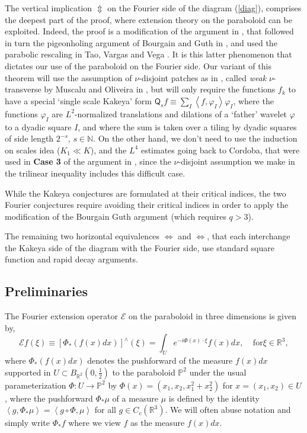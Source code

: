 \documentclass{amsart}%
\theoremstyle{plain}
\numberwithin{equation}{section}
\begin{document}
The vertical implication $\Updownarrow$ on the Fourier side of the diagram
(\ref{diag}), comprises the deepest part of the proof, where extension theory
on the paraboloid can be exploited. Indeed, the proof is a modification of the
argument in \cite[proof of Theorem 3]{RiSa}, that followed in turn the
pigeonholing argument of Bourgain and Guth in \cite[Section 2]{BoGu}, and used
the parabolic rescaling in Tao, Vargas and Vega \cite{TaVaVe}. It is this
latter phenomenon that dictates our use of the paraboloid on the Fourier side.
Our variant of this theorem will use the assumption of $\nu$-disjoint patches
as in \cite{RiSa}, called \emph{weak} $\nu$-transverse by Muscalu and Oliveira
in \cite{MuOl}, but will only require the functions $f_{k}$ to have a special
`single scale Kakeya' form $\mathsf{Q}_{s}f\equiv\sum_{I}\left\langle
f,\varphi_{I}\right\rangle \varphi_{I}$, where the functions $\varphi_{I}$ are
$L^{2}$-normalized translations and dilations of a `father' wavelet $\varphi$
to a dyadic square $I$, and where the sum is taken over a tiling by dyadic
squares of side length $2^{-s}$, $s\in\mathbb{N}$. On the other hand, we don't
need to use the induction on scales idea ($K_{1}\ll K$), and the $L^{4}$
estimates going back to Cordoba, that were used in \textbf{Case 3} of the
argument in \cite[Section 2]{BoGu}, since the $\nu$-disjoint assumption we
make in the trilinear inequality includes this difficult case.

While the Kakeya conjectures are formulated at their critical indices, the two
Fourier conjectures require avoiding their critical indices in order to apply
the modification of the Bourgain Guth argument (which requires $q>3$).

The remaining two horizontal equivalences $\Longleftrightarrow$ and
$\Longleftrightarrow$, that each interchange the Kakeya side of the diagram
with the Fourier side, use standard square function and rapid decay arguments.

\subsection{Preliminaries}

The Fourier extension operator $\mathcal{E}$ on the paraboloid in three
dimensions is given by,%
\[
\mathcal{E}f\left(  \xi\right)  \equiv\left[  \Phi_{\ast}\left(  f\left(
x\right)  dx\right)  \right]  ^{\wedge}\left(  \xi\right)  =\int_{U}%
e^{-i\Phi\left(  x\right)  \cdot\xi}f\left(  x\right)  dx,\ \ \ \ \ \text{for
}\xi\in\mathbb{R}^{3},
\]
where $\Phi_{\ast}\left(  f\left(  x\right)  dx\right)  $ denotes the
pushforward of the measure $f\left(  x\right)  dx$ supported in $U\subset
B_{\mathbb{R}^{2}}\left(  0,\frac{1}{2}\right)  $ to the paraboloid
$\mathbb{P}^{2}$ under the usual parameterization $\Phi:U\rightarrow
\mathbb{P}^{2}$ by $\Phi\left(  x\right)  =\left(  x_{1},x_{2},x_{1}^{2}%
+x_{2}^{2}\right)  $ for $x=\left(  x_{1},x_{2}\right)  \in U$, where the
pushforward $\Phi_{\ast}\mu$ of a measure $\mu$ is defined by the identity
$\left\langle g,\Phi_{\ast}\mu\right\rangle =\left\langle g\circ\Phi
,\mu\right\rangle $ for all $g\in C_{c}\left(  \mathbb{R}^{3}\right)  $. We
will often abuse notation and simply write $\Phi_{\ast}f$ where we view $f$ as
the measure $f\left(  x\right)  dx$.
\end{document}
